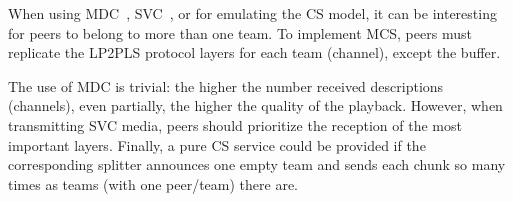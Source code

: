When using MDC~\cite{baccichet2007content}, SVC~\cite{chu2009auction},
or for emulating the CS model, it can be interesting for peers to
belong to more than one team. To implement MCS, peers must replicate
the LP2PLS protocol layers for each team (channel), except the buffer.

The use of MDC is trivial: the higher the number received descriptions
(channels), even partially, the higher the quality of the
playback. However, when transmitting SVC media, peers should
prioritize the reception of the most important layers. Finally, a
pure CS service could be provided if the corresponding splitter
announces one empty team and sends each chunk so many times as teams
(with one peer/team) there are.
